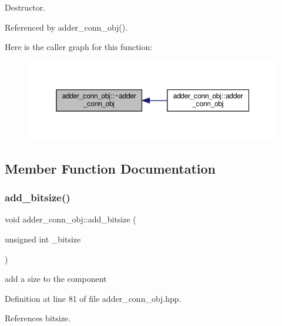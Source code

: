 Destructor. 



Referenced by adder\+\_\+conn\+\_\+obj().

Here is the caller graph for this function\+:
\nopagebreak
\begin{figure}[H]
\begin{center}
\leavevmode
\includegraphics[width=350pt]{da/dea/classadder__conn__obj_a3d39a846cd2b74f7895927bf9c63e116_icgraph}
\end{center}
\end{figure}


\subsection{Member Function Documentation}
\mbox{\label{classadder__conn__obj_a9a52d1dc9b61c75ca6f8708beddc56b4}} 
\subsubsection{\texorpdfstring{add\+\_\+bitsize()}{add\_bitsize()}}
{\footnotesize\ttfamily void adder\+\_\+conn\+\_\+obj\+::add\+\_\+bitsize (\begin{DoxyParamCaption}\item[{unsigned int}]{\+\_\+bitsize }\end{DoxyParamCaption})\hspace{0.3cm}{\ttfamily [inline]}}



add a size to the component 



Definition at line 81 of file adder\+\_\+conn\+\_\+obj.\+hpp.



References bitsize.

\mbox{\label{classadder__conn__obj_a05568e1511e7a9505d899ce6fa964f95}} 
